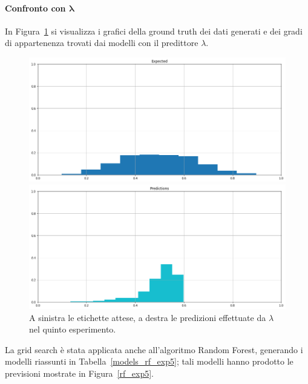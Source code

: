 \documentclass[12pt]{report}
\theoremstyle{definition}
\begin{document}
\paragraph{Confronto con $\bm{\lambda}$}
In Figura~\ref{prediction_exp5} si visualizza i grafici della ground truth dei dati generati e dei gradi di appartenenza trovati dai modelli con il predittore $\lambda$.
\begin{figure}
\centering
    \begin{minipage}{0.48\textwidth}
        \includegraphics[width=\linewidth]{images/experiment_beta5_sovrapposti/expected_memberships.png}
    \end{minipage}
    \begin{minipage}{0.48\textwidth}
        \includegraphics[width=\linewidth]{images/experiment_beta5_sovrapposti/prediction_memberships.png}
    \end{minipage}
    \caption{A sinistra le etichette attese, a destra le predizioni effettuate da $\lambda$ nel quinto esperimento.}
    \label{prediction_exp5}
\end{figure} 
La grid search è stata applicata anche all'algoritmo Random Forest, generando i modelli riassunti in Tabella~\ref{models_rf_exp5}; tali modelli hanno prodotto le previsioni mostrate in Figura~\ref{rf_exp5}.
\end{document}
